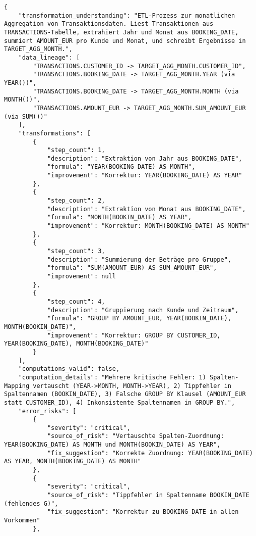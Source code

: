 \begin{lstlisting}[caption={Ausgabe: Claude Sonnet 4 Anwendungsfall 1 Hauptdurchlauf},label={claude_case1_prompt1}]
{
    "transformation_understanding": "ETL-Prozess zur monatlichen Aggregation von Transaktionsdaten. Liest Transaktionen aus TRANSACTIONS-Tabelle, extrahiert Jahr und Monat aus BOOKING_DATE, summiert AMOUNT_EUR pro Kunde und Monat, und schreibt Ergebnisse in TARGET_AGG_MONTH.",
    "data_lineage": [
        "TRANSACTIONS.CUSTOMER_ID -> TARGET_AGG_MONTH.CUSTOMER_ID",
        "TRANSACTIONS.BOOKING_DATE -> TARGET_AGG_MONTH.YEAR (via YEAR())",
        "TRANSACTIONS.BOOKING_DATE -> TARGET_AGG_MONTH.MONTH (via MONTH())",
        "TRANSACTIONS.AMOUNT_EUR -> TARGET_AGG_MONTH.SUM_AMOUNT_EUR (via SUM())"
    ],
    "transformations": [
        {
            "step_count": 1,
            "description": "Extraktion von Jahr aus BOOKING_DATE",
            "formula": "YEAR(BOOKING_DATE) AS MONTH",
            "improvement": "Korrektur: YEAR(BOOKING_DATE) AS YEAR"
        },
        {
            "step_count": 2,
            "description": "Extraktion von Monat aus BOOKING_DATE",
            "formula": "MONTH(BOOKIN_DATE) AS YEAR",
            "improvement": "Korrektur: MONTH(BOOKING_DATE) AS MONTH"
        },
        {
            "step_count": 3,
            "description": "Summierung der Beträge pro Gruppe",
            "formula": "SUM(AMOUNT_EUR) AS SUM_AMOUNT_EUR",
            "improvement": null
        },
        {
            "step_count": 4,
            "description": "Gruppierung nach Kunde und Zeitraum",
            "formula": "GROUP BY AMOUNT_EUR, YEAR(BOOKIN_DATE), MONTH(BOOKIN_DATE)",
            "improvement": "Korrektur: GROUP BY CUSTOMER_ID, YEAR(BOOKING_DATE), MONTH(BOOKING_DATE)"
        }
    ],
    "computations_valid": false,
    "computation_details": "Mehrere kritische Fehler: 1) Spalten-Mapping vertauscht (YEAR->MONTH, MONTH->YEAR), 2) Tippfehler in Spaltennamen (BOOKIN_DATE), 3) Falsche GROUP BY Klausel (AMOUNT_EUR statt CUSTOMER_ID), 4) Inkonsistente Spaltennamen in GROUP BY.",
    "error_risks": [
        {
            "severity": "critical",
            "source_of_risk": "Vertauschte Spalten-Zuordnung: YEAR(BOOKING_DATE) AS MONTH und MONTH(BOOKIN_DATE) AS YEAR",
            "fix_suggestion": "Korrekte Zuordnung: YEAR(BOOKING_DATE) AS YEAR, MONTH(BOOKING_DATE) AS MONTH"
        },
        {
            "severity": "critical",
            "source_of_risk": "Tippfehler in Spaltenname BOOKIN_DATE (fehlendes G)",
            "fix_suggestion": "Korrektur zu BOOKING_DATE in allen Vorkommen"
        },

\end{lstlisting}
